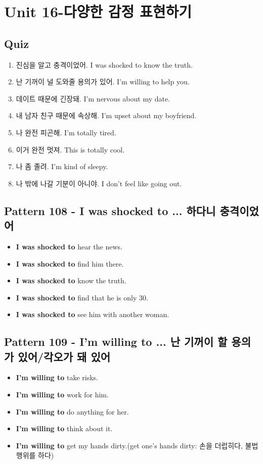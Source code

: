 \documentclass[11pt]{oblivoir}
\begin{document}
\section{Unit 16-다양한 감정 표현하기}
\subsection{Quiz}
\begin{enumerate}
  \color{red} \item 진심을 알고 충격이었어.
    \color{light-gray} I was shocked to know the truth.
  \color{red} \item 난 기꺼이 널 도와줄 용의가 있어.
    \color{light-gray} I'm willing to help you.
  \color{red} \item 데이트 때문에 긴장돼.
    \color{light-gray} I'm nervous about my date.
  \color{red} \item 내 남자 친구 때문에 속상해.
    \color{light-gray} I'm upset about my boyfriend.
  \color{red} \item 나 완전 피곤해.
    \color{light-gray} I'm totally tired.
  \color{red} \item 이거 완전 멋져.
    \color{light-gray} This is totally cool.
   \color{red} \item 나 좀 졸려.
    \color{light-gray} I'm kind of sleepy.
   \color{red} \item 나 밖에 나갈 기분이 아니야.
    \color{light-gray} I don't feel like going out.
\end{enumerate}

\subsection{Pattern 108 - I was shocked to ... \texttildelow 하다니 충격이었어}
\begin{itemize}
  \item \textbf{I was shocked to} hear the news.
  \item \textbf{I was shocked to} find him there.
  \item \textbf{I was shocked to} know the truth.
  \item \textbf{I was shocked to} find that he is only 30.
  \item \textbf{I was shocked to} see him with another woman.
\end{itemize}

\subsection{Pattern 109 - I'm willing to ... 난 기꺼이  \texttildelow 할 용의가 있어/각오가 돼 있어}
\begin{itemize}
  \item \textbf{I'm willing to} take risks.
  \item \textbf{I'm willing to} work for him.
  \item \textbf{I'm willing to} do anything for her.
  \item \textbf{I'm willing to} think about it.
  \item \textbf{I'm willing to} get my hands dirty.(get one's hands dirty: 손을 더럽히다, 불법 행위를 하다)
\end{itemize}
\end{document}
